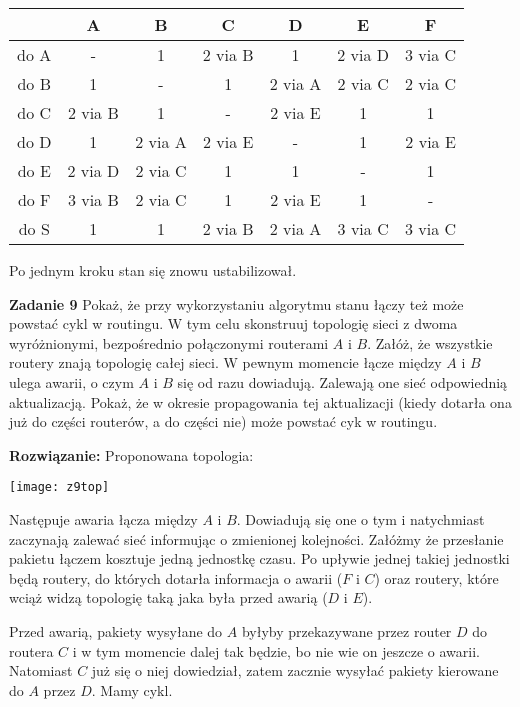 \documentclass[12pt,a4paper]{article}
\begin{document}
\vskip 0.2cm
\begin{tabular}{ | c | c | c | c | c | c | c | }
 \hline
      &     A   &     B    &    C    &    D    &     E   &    F    \\
 \hline
 do A & -       & 1        & 2 via B & 1       & 2 via D & 3 via C \\
 do B & 1       & -        & 1       & 2 via A & 2 via C & 2 via C \\
 do C & 2 via B & 1        & -       & 2 via E & 1       & 1       \\
 do D & 1       & 2 via A  & 2 via E & -       & 1       & 2 via E \\
 do E & 2 via D & 2 via C  & 1       & 1       & -       & 1       \\
 do F & 3 via B & 2 via C  & 1       & 2 via E & 1       & -       \\
 do S & 1       & 1        & 2 via B & 2 via A & 3 via C & 3 via C \\
 \hline
\end{tabular}

\vskip 0.2cm
\noindent
Po jednym kroku stan się znowu ustabilizował.

\vskip 0.2cm
\noindent
\textbf{Zadanie 9} Pokaż, że przy wykorzystaniu algorytmu stanu łączy też może powstać cykl w routingu. W tym celu skonstruuj topologię sieci z dwoma wyróżnionymi, bezpośrednio połączonymi routerami \(A\) i \(B\). Załóż, że wszystkie routery znają topologię całej sieci. W pewnym momencie łącze między \(A\) i \(B\) ulega awarii, o czym \(A\) i \(B\) się od razu dowiadują. Zalewają one sieć odpowiednią aktualizacją. Pokaż, że w okresie propagowania tej aktualizacji (kiedy dotarła ona już do części routerów, a do części nie) może powstać cyk w routingu.
\vskip 0.2cm

\noindent
\textbf{Rozwiązanie:} Proponowana topologia:

\begin{center}
	\texttt{[image: z9top]}	
\end{center}

\noindent
Następuje awaria łącza między \(A\) i \(B\). Dowiadują się one o tym i natychmiast zaczynają zalewać sieć informując o zmienionej kolejności. Załóżmy że przesłanie pakietu łączem kosztuje jedną jednostkę czasu. Po upływie jednej takiej jednostki będą routery, do których dotarła informacja o awarii (\(F\) i \(C\)) oraz routery, które wciąż widzą topologię taką jaka była przed awarią (\(D\) i \(E\)).

Przed awarią, pakiety wysyłane do \(A\) byłyby przekazywane przez router \(D\) do routera \(C\) i w tym momencie dalej tak będzie, bo nie wie on jeszcze o awarii. Natomiast \(C\) już się o niej dowiedział, zatem zacznie wysyłać pakiety kierowane do \(A\) przez \(D\). Mamy cykl.
\end{document}
